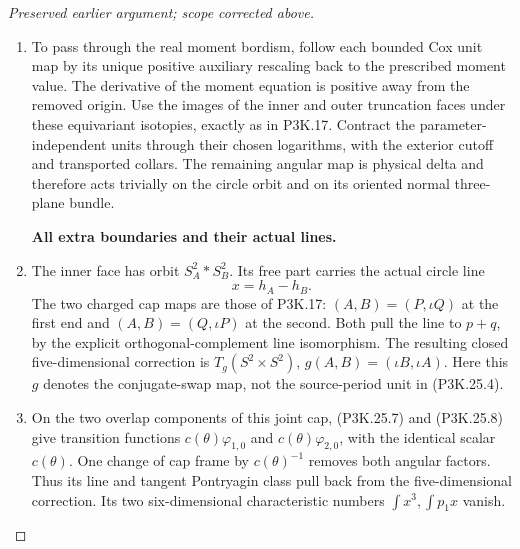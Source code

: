 \begin{proof}[Preserved earlier argument; scope corrected above]
\begin{enumerate}[label=\arabic*.]
\item To pass through the real moment bordism, follow each bounded
Cox unit map by its unique positive auxiliary rescaling back
to the prescribed moment value. The derivative of the moment
equation is positive away from the removed origin. Use the
images of the inner and outer truncation faces under these
equivariant isotopies, exactly as in P3K.17. Contract the
parameter-independent units through their chosen logarithms,
with the exterior cutoff and transported collars. The
remaining angular map is physical delta and therefore acts
trivially on the circle orbit and on its oriented normal
three-plane bundle.

\par\medskip\noindent\textbf{All extra boundaries and their actual lines.}\enspace

\item The inner face has orbit \(S^2_A*S^2_B\). Its free part carries
the actual circle line
\[
                       x=h_A-h_B.
                                                        \tag{P3K.25.9}
\]
The two charged cap maps are those of P3K.17:
\((A,B)=(P,\iota Q)\) at the first end and
\((A,B)=(Q,\iota P)\) at the second. Both pull the line to
\(p+q\), by the explicit orthogonal-complement line
isomorphism. The resulting closed five-dimensional correction
is \(T_g(S^2\times S^2)\), \(g(A,B)=(\iota B,\iota A)\).
Here this \(g\) denotes the conjugate-swap map, not the
source-period unit in (P3K.25.4).

\item On the two overlap components of this joint cap, (P3K.25.7)
and (P3K.25.8) give transition functions
\(c(\theta)\varphi_{1,0}\) and
\(c(\theta)\varphi_{2,0}\), with the identical scalar
\(c(\theta)\). One change of cap frame by \(c(\theta)^{-1}\)
removes both angular factors. Thus its line and tangent
Pontryagin class pull back from the five-dimensional
correction. Its two six-dimensional characteristic numbers
\(\int x^3,\int p_1x\) vanish.


\end{enumerate}
\end{proof}
